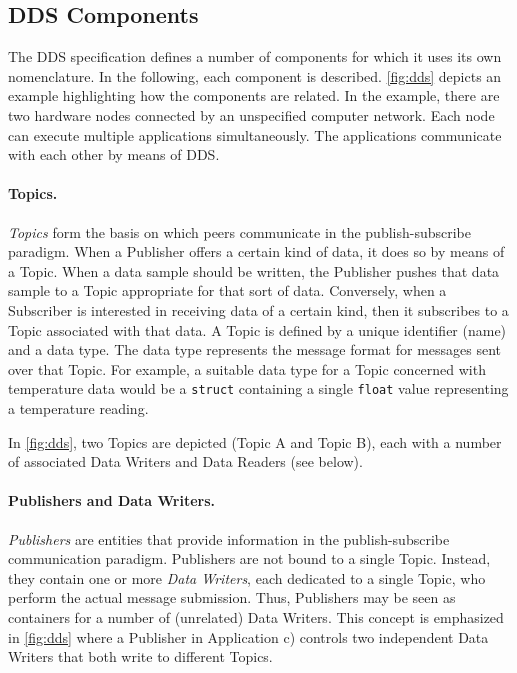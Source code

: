\subsection{DDS Components}

The DDS specification defines a number of components for which it uses its own nomenclature. In the following, each component is described. \autoref{fig:dds} depicts an example highlighting how the components are related. In the example, there are two hardware nodes connected by an unspecified computer network. Each node can execute multiple applications simultaneously. The applications communicate with each other by means of DDS. 

\paragraph{Topics.}
\emph{Topics} form the basis on which peers communicate in the publish-subscribe paradigm. When a Publisher offers a certain kind of data, it does so by means of a Topic. When a data sample should be written, the Publisher pushes that data sample to a Topic appropriate for that sort of data. Conversely, when a Subscriber is interested in receiving data of a certain kind, then it subscribes to a Topic associated with that data. A Topic is defined by a unique identifier (name) and a data type. The data type represents the message format for messages sent over that Topic. For example, a suitable data type for a Topic concerned with temperature data would be a \texttt{struct} containing a single \texttt{float} value representing a temperature reading.

In \autoref{fig:dds}, two Topics are depicted (Topic A and Topic B), each with a number of associated Data Writers and Data Readers (see below). 

\paragraph{Publishers and Data Writers.}
\emph{Publishers} are entities that provide information in the publish-subscribe communication paradigm. Publishers are not bound to a single Topic. Instead, they contain one or more \emph{Data Writers}, each dedicated to a single Topic, who perform the actual message submission. Thus, Publishers may be seen as containers for a number of (unrelated) Data Writers. This concept is emphasized in \autoref{fig:dds} where a Publisher in Application c) controls two independent Data Writers that both write to different Topics.

